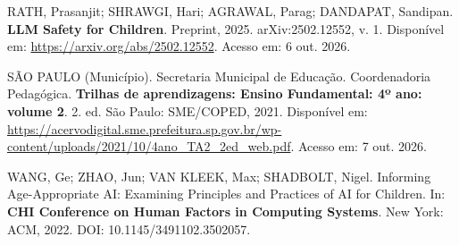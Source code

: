\documentclass[12pt,openany,oneside,a4paper,english,brazil]{abntex2}
\begin{document}
RATH, Prasanjit; SHRAWGI, Hari; AGRAWAL, Parag; DANDAPAT, Sandipan. \textbf{LLM Safety for Children}. Preprint, 2025. arXiv:2502.12552, v. 1. Disponível em: \url{https://arxiv.org/abs/2502.12552}. Acesso em: 6 out. 2026.

SÃO PAULO (Município). Secretaria Municipal de Educação. Coordenadoria Pedagógica. \textbf{Trilhas de aprendizagens: Ensino Fundamental: 4º ano: volume 2}. 2. ed. São Paulo: SME/COPED, 2021. Disponível em: \url{https://acervodigital.sme.prefeitura.sp.gov.br/wp-content/uploads/2021/10/4ano_TA2_2ed_web.pdf}. Acesso em: 7 out. 2026.

WANG, Ge; ZHAO, Jun; VAN KLEEK, Max; SHADBOLT, Nigel. Informing Age-Appropriate AI: Examining Principles and Practices of AI for Children. In: \textbf{CHI Conference on Human Factors in Computing Systems}. New York: ACM, 2022. DOI: 10.1145/3491102.3502057.

\endgroup
\end{document}
